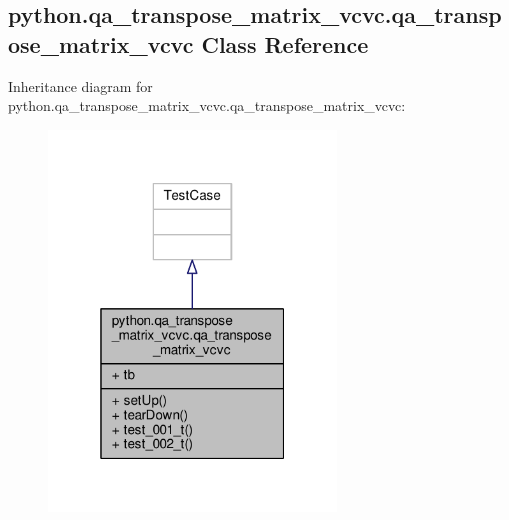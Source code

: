 \subsection{python.\+qa\+\_\+transpose\+\_\+matrix\+\_\+vcvc.\+qa\+\_\+transpose\+\_\+matrix\+\_\+vcvc Class Reference}
\label{classpython_1_1qa__transpose__matrix__vcvc_1_1qa__transpose__matrix__vcvc}


Inheritance diagram for python.\+qa\+\_\+transpose\+\_\+matrix\+\_\+vcvc.\+qa\+\_\+transpose\+\_\+matrix\+\_\+vcvc\+:
\nopagebreak
\begin{figure}[H]
\begin{center}
\leavevmode
\includegraphics[width=217pt]{d7/d23/classpython_1_1qa__transpose__matrix__vcvc_1_1qa__transpose__matrix__vcvc__inherit__graph}
\end{center}
\end{figure}


